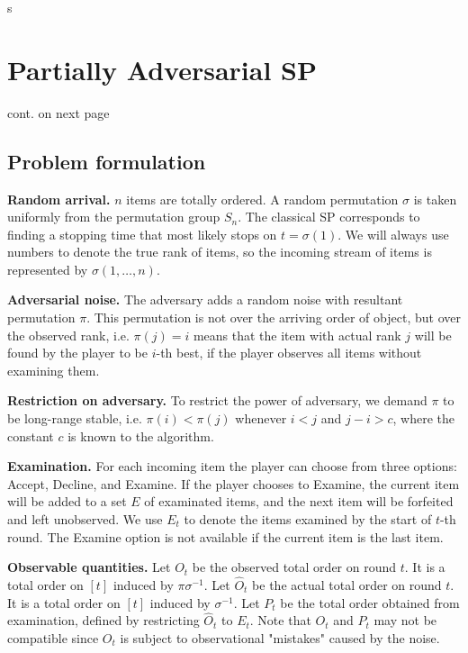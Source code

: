 s

\section{Partially Adversarial SP}
cont. on next page

\newpage
\subsection{Problem formulation }
\textbf{Random arrival.} $n $ items are totally ordered. A random permutation $\sigma $ is taken uniformly from the permutation group $S_n$. The classical SP corresponds to finding a stopping time that most likely stops on $t = \sigma(1)$. We will always use numbers to denote the true rank of items, so the incoming stream of items is represented by $\sigma(1,\ldots,n)$.

\textbf{Adversarial noise.} The adversary adds a random noise with resultant permutation $\pi $. This permutation is not over the arriving order of object, but over the observed rank, i.e. $\pi(j)=i $ means that the item with actual rank $j $ will be found by the player to be $i $-th best, if the player observes all items without examining them.

\textbf{Restriction on adversary.} To restrict the power of adversary, we demand $\pi$ to be long-range stable, i.e. $\pi(i)<\pi(j)$ whenever $i<j $ and $j-i>c $, where the constant $c $ is known to the algorithm.

\textbf{Examination.} For each incoming item the player can choose from three options: \textsf{Accept}, \textsf{Decline}, and \textsf{Examine}. If the player chooses to \textsf{Examine}, the current item will be added to a set $E $ of examinated items, and the next item will be forfeited and left unobserved. We use $E_t$ to denote the items examined by the start of $t $-th round. The \textsf{Examine} option is not available if the current item is the last item.

\textbf{Observable quantities.} 
Let $O_t$ be the observed total order on round $t $. It is a total order on $[t] $ induced by $\pi \sigma^{-1}$.
Let $\widehat{O}_t$ be the actual total order on round $t$. It is a total order on $[t] $ induced by $\sigma^{-1}$.
Let $P_t $ be the total order obtained from examination, defined by restricting $\widehat{O}_t $ to $E_t $. Note that $O_t$ and $P_t$ may not be compatible since $O_t$ is subject to observational "mistakes" caused by the noise.

